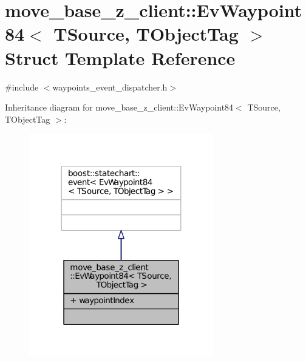 \hypertarget{structmove__base__z__client_1_1EvWaypoint84}{}\section{move\+\_\+base\+\_\+z\+\_\+client\+:\+:Ev\+Waypoint84$<$ T\+Source, T\+Object\+Tag $>$ Struct Template Reference}
\label{structmove__base__z__client_1_1EvWaypoint84}


{\ttfamily \#include $<$waypoints\+\_\+event\+\_\+dispatcher.\+h$>$}



Inheritance diagram for move\+\_\+base\+\_\+z\+\_\+client\+:\+:Ev\+Waypoint84$<$ T\+Source, T\+Object\+Tag $>$\+:
\nopagebreak
\begin{figure}[H]
\begin{center}
\leavevmode
\includegraphics[width=227pt]{structmove__base__z__client_1_1EvWaypoint84__inherit__graph}
\end{center}
\end{figure}


